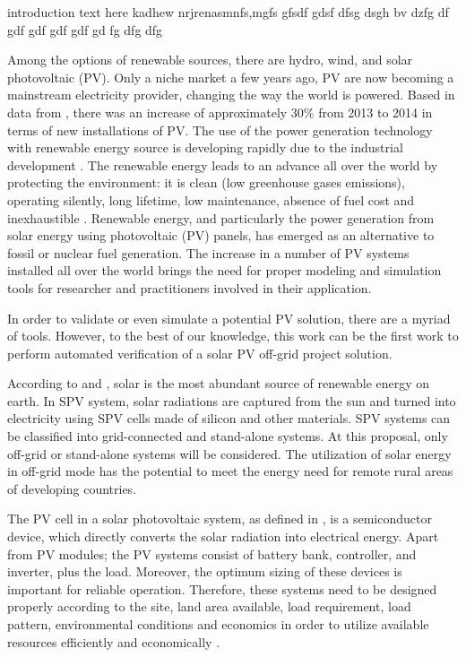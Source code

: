 introduction text here kadhew nrjrenasmnfs,mgfs gfsdf gdsf dfsg dsgh bv dzfg df gdf gdf gdf gdf gd fg dfg dfg

Among the options of renewable sources, there are hydro, wind, and solar photovoltaic (PV). Only a niche market a few years ago, PV are now becoming a mainstream electricity provider, changing the way the world is powered. Based in data from \cite{EPIA}, there was an increase of approximately 30\% from 2013 to 2014 in terms of new installations of PV. The use of the power generation technology with renewable energy source is developing rapidly due to the industrial development \cite{Yatimi}. The renewable energy leads to an advance all over the world by protecting the environment: it is clean (low greenhouse gases emissions), operating silently, long lifetime, low maintenance, absence of fuel cost and inexhaustible \cite{Noroozian}. Renewable energy, and particularly the power generation from solar energy using photovoltaic (PV) panels, has emerged as an alternative to fossil or nuclear fuel generation. The increase in a number of PV systems installed all over the world brings the need for proper modeling and simulation tools for researcher and practitioners involved in their application. 

In order to validate or even simulate a potential PV solution, there are a myriad of tools. However, to the best of our knowledge, this work can be the first work to perform automated verification of a solar PV off-grid project solution.  

According to \cite{SEIA} and \cite{Chauhan}, solar is the most abundant source of renewable energy on earth. In SPV system, solar radiations are captured from the sun and turned into electricity using SPV cells made of silicon and other materials. SPV systems can be classified into grid-connected and stand-alone systems. At this proposal, only off-grid or stand-alone systems will be considered. The utilization of solar energy in off-grid mode has the potential to meet the energy need for remote rural areas of developing countries.  

The PV cell in a solar photovoltaic system, as defined in \cite{Rawat}, is a semiconductor device, which directly converts the solar radiation into electrical energy. Apart from PV modules; the PV systems consist of battery bank, controller, and inverter, plus the load. Moreover, the optimum sizing of these devices is important for reliable operation. Therefore, these systems need to be designed properly according to the site, land area available, load requirement, load pattern, environmental conditions and economics in order to utilize available resources efficiently and economically \cite{Rawat}.

